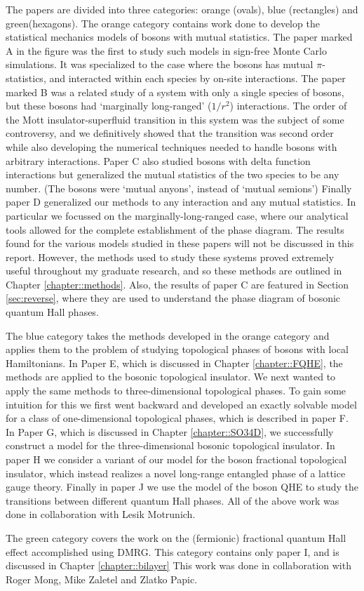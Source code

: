 The papers are divided into three categories: orange (ovals), blue (rectangles) and green(hexagons). The orange category contains work done to develop the statistical mechanics models of bosons with mutual statistics. The paper marked A \cite{Loopy} in the figure was the first to study such models in sign-free Monte Carlo simulations. It was specialized to the case where the bosons has mutual $\pi$-statistics, and interacted within each species by on-site interactions. 
The paper marked B\cite{Ranged_Loops} was a related study of a system with only a single species of bosons, but these bosons had `marginally long-ranged' ($1/r^2$) interactions. The order of the Mott insulator-superfluid transition in this system was the subject of some controversy, and we definitively showed that the transition was second order while also developing the numerical techniques needed to handle bosons with arbitrary interactions. 
Paper C\cite{short_range3} also studied bosons with delta function interactions but generalized the mutual statistics of the two species to be any number. (The bosons were `mutual anyons', instead of `mutual semions') 
Finally paper D\cite{Gen2Loops} generalized our methods to any interaction and any mutual statistics. In particular we focussed on the marginally-long-ranged case, where our analytical tools allowed for the complete establishment of the phase diagram. The results found for the various models studied in these papers will not be discussed in this report. However, the methods used to study these systems proved extremely useful throughout my graduate research, and so these methods are outlined in Chapter \ref{chapter::methods}. Also, the results of paper C are featured in Section \ref{sec:reverse}, where they are used to understand the phase diagram of bosonic quantum Hall phases.

The blue category takes the methods developed in the orange category and applies them to the problem of studying topological phases of bosons with local Hamiltonians. In Paper E\cite{FQHE}, which is discussed in Chapter \ref{chapter::FQHE}, the methods are applied to the bosonic topological insulator. We next wanted to apply the same methods to three-dimensional topological phases. To gain some intuition for this we first went backward and developed an exactly solvable model for a class of one-dimensional topological phases, which is described in paper F\cite{1DSPT}. In Paper G\cite{SO34D}, which is discussed in Chapter \ref{chapter::SO34D}, we successfully construct a model for the three-dimensional bosonic topological insulator. In paper H\cite{FracFaraday} we consider a variant of our model for the boson fractional topological insulator, which instead realizes a novel long-range entangled phase of a lattice gauge theory. Finally in paper J\cite{JongYeon} we use the model of the boson QHE to study the transitions between different quantum Hall phases. All of the above work was done in collaboration with Lesik Motrunich.

The green category covers the work on the (fermionic) fractional quantum Hall effect accomplished using DMRG. This category contains only paper I\cite{bilayer}, and is discussed in Chapter \ref{chapter::bilayer} This work was done in collaboration with Roger Mong, Mike Zaletel and Zlatko Papic.
